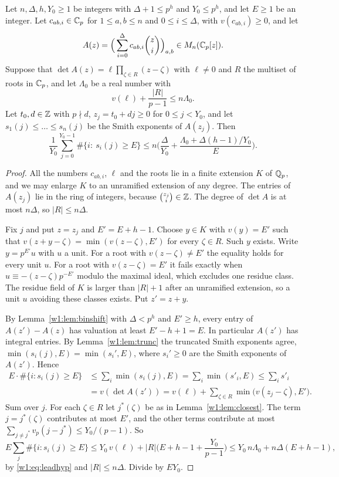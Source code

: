 \begin{theorem}\label{w1:thm:window}
Let $n,\Delta,h,Y_0\ge1$ be integers with $\Delta+1\le p^h$ and $Y_0\le p^h$, and let $E\ge1$ be an integer. Let $c_{ab,i}\in\mathbb C_p$ for $1\le a,b\le n$ and $0\le i\le\Delta$, with $v(c_{ab,i})\ge0$, and let
\[
A(z)=\Big(\sum_{i=0}^{\Delta}c_{ab,i}\binom zi\Big)_{a,b}\in M_n(\mathbb C_p[z]).
\]
Suppose that $\det A(z)=\ell\prod_{\zeta\in R}(z-\zeta)$ with $\ell\ne0$ and $R$ the multiset of roots in $\mathbb C_p$, and let $\Lambda_0$ be a real number with
\begin{equation}\label{w1:eq:leadhyp}
v(\ell)+\frac{\lvert R\rvert}{p-1}\le n\Lambda_0 .
\end{equation}
Let $t_0,d\in\mathbb Z$ with $p\nmid d$, $z_j=t_0+dj\ge0$ for $0\le j<Y_0$, and let $s_1(j)\le\dots\le s_n(j)$ be the Smith exponents of $A(z_j)$. Then
\begin{equation}\label{w1:eq:window}
\frac1{Y_0}\sum_{j=0}^{Y_0-1}\#\{i:\ s_i(j)\ge E\}\le n\Big(\frac{\Delta}{Y_0}+\frac{\Lambda_0+\Delta(h-1)/Y_0}{E}\Big).
\end{equation}
\end{theorem}

\begin{proof}
All the numbers $c_{ab,i}$, $\ell$ and the roots lie in a finite extension $K$ of $\mathbb Q_p$, and we may enlarge $K$ to an unramified extension of any degree. The entries of $A(z_j)$ lie in the ring of integers, because $\binom{z_j}i\in\mathbb Z$. The degree of $\det A$ is at most $n\Delta$, so $\lvert R\rvert\le n\Delta$.

Fix $j$ and put $z=z_j$ and $E'=E+h-1$. Choose $y\in K$ with $v(y)=E'$ such that $v(z+y-\zeta)=\min(v(z-\zeta),E')$ for every $\zeta\in R$. Such $y$ exists. Write $y=p^{E'}u$ with $u$ a unit. For a root with $v(z-\zeta)\ne E'$ the equality holds for every unit $u$. For a root with $v(z-\zeta)=E'$ it fails exactly when $u\equiv-(z-\zeta)p^{-E'}$ modulo the maximal ideal, which excludes one residue class. The residue field of $K$ is larger than $\lvert R\rvert+1$ after an unramified extension, so a unit $u$ avoiding these classes exists. Put $z'=z+y$.

By Lemma~\ref{w1:lem:binshift} with $\Delta<p^h$ and $E'\ge h$, every entry of $A(z')-A(z)$ has valuation at least $E'-h+1=E$. In particular $A(z')$ has integral entries. By Lemma~\ref{w1:lem:trunc} the truncated Smith exponents agree, $\min(s_i(j),E)=\min(s_i',E)$, where $s_i'\ge0$ are the Smith exponents of $A(z')$. Hence
\begin{align*}
E\cdot\#\{i:s_i(j)\ge E\}&\le\sum_i\min(s_i(j),E)=\sum_i\min(s'_i,E)\le\sum_is'_i\\
&=v(\det A(z'))=v(\ell)+\sum_{\zeta\in R}\min\big(v(z_j-\zeta),E'\big).
\end{align*}
Sum over $j$. For each $\zeta\in R$ let $j^*(\zeta)$ be as in Lemma~\ref{w1:lem:closest}. The term $j=j^*(\zeta)$ contributes at most $E'$, and the other terms contribute at most $\sum_{j\ne j^*}v_p(j-j^*)\le Y_0/(p-1)$. So
\[
E\sum_j\#\{i:s_i(j)\ge E\}\le Y_0\,v(\ell)+\lvert R\rvert\Big(E+h-1+\frac{Y_0}{p-1}\Big)\le Y_0\,n\Lambda_0+n\Delta(E+h-1),
\]
by \eqref{w1:eq:leadhyp} and $\lvert R\rvert\le n\Delta$. Divide by $EY_0$.
\end{proof}

